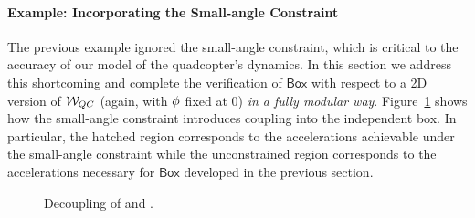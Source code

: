 \paragraph*{Example: Incorporating the Small-angle Constraint}
The previous example ignored the small-angle constraint, which is critical
to the accuracy of our model of the quadcopter's dynamics.  In this section
we address this shortcoming and complete the verification of $\mathsf{Box}$
with respect to a 2D version of $\mathcal{W}_{QC}$ (again, with $\mathbf{\phi}$
fixed at 0) \emph{in a fully modular way}.  Figure~\ref{fig:small-angle}
shows how the small-angle constraint introduces coupling into the
independent box.  In particular, the hatched region corresponds to the
accelerations achievable under the small-angle constraint while the
unconstrained region corresponds to the accelerations necessary for
$\mathsf{Box}$ developed in the previous section.

\newcommand{\Tminx}{\ensuremath{\Tmin^{x}}\xspace}
\newcommand{\Tminz}{\ensuremath{\Tmin^{z}}\xspace}

\begin{figure}[t]
\centering
{}

\caption{Decoupling of  and .}
\label{fig:small-angle}
\end{figure}

